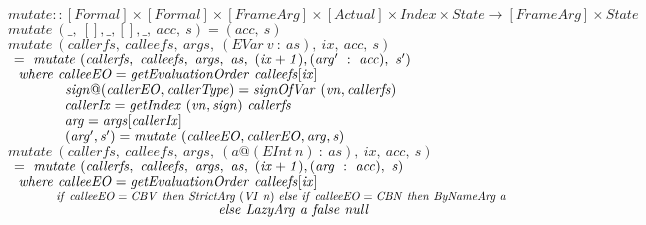 \documentclass[diploma]{softlab-thesis}
\begin{document}
\begin{figure}[h]
  \\%
  $\mathit{mutate :: [Formal] \times [Formal] \times [FrameArg]
            \times [Actual] \times Index \times State \rightarrow [FrameArg] \times State} $ \\
  $\mathit{mutate~(\_,~[],\_,[],\_,~acc,~s)=(acc,~s)}$ \\
  $\mathit{mutate~(callerfs,~calleefs,~args,~(EVar~v~:~as),~ix,~acc,~s)}$ \\
  $\mathit{\hfill\ =~mutate~(callerfs,~calleefs,~args,~as,~(ix+1),(arg'~:~acc), ~s')}$ \\
  $\mathit{\hfill\ \hfill\ where~calleeEO=getEvaluationOrder~calleefs[ix]}$ \\
  $\mathit{\hfill\ \hfill\ \hfill\ \hfill\ \hfill\ \hfill\ \hfill\ \hfill\ \hfill\ \hfill\ \hfill\ \hfill\ 
            sign@(callerEO, callerType) = signOfVar~(vn, callerfs)}$ \\
  $\mathit{\hfill\ \hfill\ \hfill\ \hfill\ \hfill\ \hfill\ \hfill\ \hfill\ \hfill\ \hfill\ \hfill\ \hfill\ 
            callerIx = getIndex~(vn, sign)~callerfs}$ \\
  $\mathit{\hfill\ \hfill\ \hfill\ \hfill\ \hfill\ \hfill\ \hfill\ \hfill\ \hfill\ \hfill\ \hfill\ \hfill\ 
            arg = args[callerIx]}$ \\
  $\mathit{\hfill\ \hfill\ \hfill\ \hfill\ \hfill\ \hfill\ \hfill\ \hfill\ \hfill\ \hfill\ \hfill\ \hfill\ 
            (arg', s') = mutate~(calleeEO, callerEO, arg, s)}$ \\
  $\mathit{mutate~(callerfs,~calleefs,~args,~(a@(EInt~n)~:~as),~ix,~acc,~s)}$ \\
  $\mathit{\hfill\ =~mutate~(callerfs,~calleefs,~args,~as,~(ix+1),(arg~:~acc), ~s)}$ \\
  $\mathit{\hfill\ \hfill\ where~calleeEO=getEvaluationOrder~calleefs[ix]}$ \\
  $\mathit{\hfill\ \hfill\ \hfill\ \hfill\ \hfill\ \hfill\ \hfill\ \hfill\ \hfill\ \hfill\ \hfill\ \hfill\ 
      if~calleeEO=CBV~then~StrictArg~(VI~n)~else~if~calleeEO=CBN~then~ByNameArg~a~}$ \\
  $\mathit{\hfill\ \hfill\ \hfill\ \hfill\ \hfill\ \hfill\ \hfill\ \hfill\ \hfill\ \hfill\ \hfill\ \hfill\ 
           \hfill\ \hfill\ \hfill\ \hfill\ \hfill\ \hfill\ \hfill\ \hfill\ \hfill\ \hfill\ \hfill\ \hfill\ 
           \hfill\ \hfill\ \hfill\ \hfill\ \hfill\ \hfill\ \hfill\ \hfill\ \hfill\ \hfill\ \hfill\ \hfill\ 
           \hfill\ \hfill\ \hfill\ \hfill\ \hfill\ \hfill\ \hfill\ \hfill\ \hfill\
    else~LazyArg~a~false~null}$ \\

\end{figure}
\end{document}
